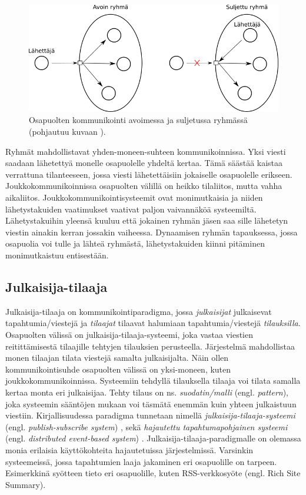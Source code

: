 \begin{figure}[ht!]
	\includegraphics[width=1\textwidth]{pictures/group-communication.png}
	\caption{Osapuolten kommunikointi avoimessa ja suljetussa ryhmässä (pohjautuu kuvaan \mbox{\cite[s.~235]{distributed-systems-concepts-and-design}}).}
	\label{fig:group-communication}
\end{figure}

Ryhmät mahdollistavat yhden-moneen-suhteen kommunikoinnissa. Yksi viesti saadaan lähetettyä monelle osapuolelle yhdeltä kertaa. Tämä säästää kaistaa verrattuna tilanteeseen, jossa viesti lähetettäisiin jokaiselle osapuolelle erikseen. Joukkokommunikoinnissa osapuolten välillä on heikko tilaliitos, mutta vahha aikaliitos. Joukkokommunikointisysteemit ovat monimutkaisia ja niiden lähetystakuiden vaatimukset vaativat paljon vaivannäköä systeemiltä. Lähetystakuihin yleensä kuuluu että jokainen ryhmän jäsen saa sille lähetetyn viestin ainakin kerran jossakin vaiheessa. Dynaamisen ryhmän tapauksessa, jossa osapuolia voi tulle ja lähteä ryhmästä, lähetystakuiden kiinni pitäminen monimutkaistuu entisestään. \mbox{\cite{group-communication-specification}} \mbox{\cite[s.~236]{distributed-systems-concepts-and-design}}


\subsection{Julkaisija-tilaaja}
Julkaisija-tilaaja on kommunikointiparadigma, jossa \emph{julkaisijat} julkaisevat tapahtumia/viestejä ja \emph{tilaajat} tilaavat halumiaan tapahtumia/viestejä \emph{tilauksilla}. Osapuolten välissä on julkaisija-tilaaja-systeemi, joka vastaa viestien reitittämisestä tilaajille tehtyjen tilauksien perusteella. Järjestelmä mahdollistaa monen tilaajan tilata viestejä samalta julkaisijalta. Näin ollen kommunikointisuhde osapuolten välissä on yksi-moneen, kuten joukkokommunikoinnissa. Systeemiin tehdyllä tilauksella tilaaja voi tilata samalla kertaa monta eri julkaisijaa. Tehty tilaus on ns. \emph{suodatin/malli} (engl. \emph{pattern}), joka systeemin sääntöjen mukaan voi täsmätä enemmän kuin yhteen julkaistuun viestiin. Kirjallisuudessa paradigma tunnetaan nimellä \emph{julkaisija-tilaaja-systeemi} (engl. \emph{publish-subscribe system}) \cite{baldoni2005distributed}, sekä \emph{hajautettu tapahtumapohjainen systeemi} (engl. \emph{distributed event-based system}) \cite{distributed-event-based-systems}. Julkaisija-tilaaja-paradigmalle on olemassa monia erilaisia käyttökohteita hajautetuissa järjestelmissä. Varsinkin systeemeissä, jossa tapahtumien laaja jakaminen eri osapuolille on tarpeen. Esimerkkinä syötteen tieto eri osapuolille, kuten RSS-verkkosyöte (engl. Rich Site Summary).

